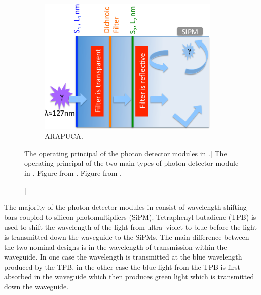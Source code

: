 \begin{figure}
\begin{subfigure}[b]{0.69\textwidth}
		\includegraphics[width=0.95\textwidth]{figures/pdsp_arapuca.png}
		\caption{ARAPUCA.}
		\label{fig:arapuca}
	\end{subfigure}

	\caption
	[The operating principal of the photon detector modules in \protodune{}.]
	{The operating principal of the two main types of photon detector module in 
	\protodune{}. Figure  from \cite{Abi:2017aow}. Figure 
	 from \cite{Machado:2016jqe}.}

	\label{fig:pdsp_pd}

\end{figure}

The majority of the photon detector modules in \protodune{} consist of 
wavelength shifting bars coupled to silicon photomultipliers (SiPM). 
Tetraphenyl-butadiene (TPB) is used to shift the wavelength of the light 
from ultra--violet to blue before the light is transmitted down the waveguide to
the SiPMs. The main difference between the two nominal designs is in the 
wavelength of transmission within the waveguide. In one case the wavelength is 
transmitted at the blue wavelength produced by the TPB, in the other case the 
blue light from the TPB is first absorbed in the waveguide which then produces 
green light which is transmitted down the waveguide.

